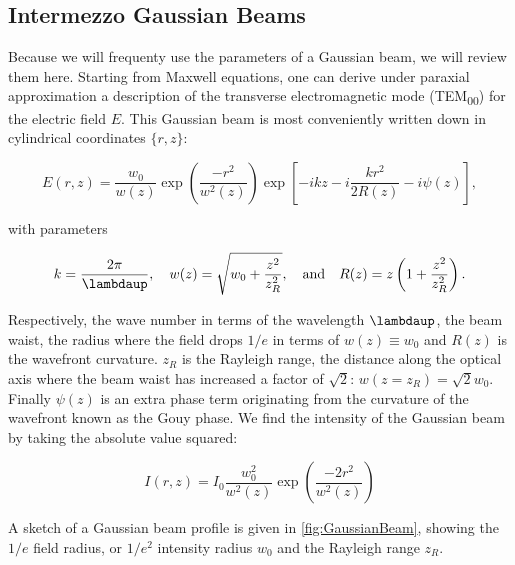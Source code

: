 \mbox{}\par
\begin{mdframed}
    \subsection*{Intermezzo Gaussian Beams}\label{sec:GaussianBeams}
    
    Because we will frequenty use the parameters of a Gaussian beam, we will review them here. 
    Starting from Maxwell equations, one can derive under paraxial approximation a description of the transverse electromagnetic mode (TEM\textsubscript{00}) \cite{Leeuwen2017} for the electric field $E$.
    This Gaussian beam is most conveniently written down in cylindrical coordinates $\{r,z\}$:
    
    \begin{equation}\label{eq:GaussianBeam}
    	E(r,z) = \frac{w_0}{w(z)} \exp{\left(\frac{-r^2}{w^2(z)}\right)} \exp{\left[-ikz-i\frac{kr^2}{2R(z)} - i\psi(z)\right]},
    \end{equation}
    
    with parameters
    
    \begin{equation}\label{eq:GaussianBeamParameters}
    	k = \frac{2\pi}{\lambdaup}, \quad 
    	w(z) = \sqrt{w_0 + \frac{z^2}{z_R^2}}, \quad \text{and} \quad
    	R(z) = z \left(1 + \frac{z^2}{z_R^2}\right).
    \end{equation}
    
    Respectively, the wave number in terms of the wavelength $\lambdaup$, the beam waist, the radius where the field drops $1/e$ in terms of $w(z)\equiv w_0$ and $R(z)$ is the wavefront curvature. $z_R$ is the Rayleigh range, the distance along the optical axis where the beam waist has increased a factor of $\sqrt{2}$: $w(z=z_R) = \sqrt{2}w_0$.
    Finally $\psi(z)$ is an extra phase term originating from the curvature of the wavefront known as the Gouy phase.
    We find the intensity of the Gaussian beam by taking the absolute value squared:
    
    \begin{equation}\label{eq:GaussianBeamIntensity}
    	I(r,z) = I_0 \frac{w_0^2}{w^2(z)} \exp{\left(\frac{-2r^2}{w^2(z)}\right)}
    \end{equation}
    
    A sketch of a Gaussian beam profile is given in \cref{fig:GaussianBeam}, showing the $1/e$ field radius, or $1/e^2$ intensity radius $w_0$ and the Rayleigh range $z_R$. 
    

\end{mdframed}
